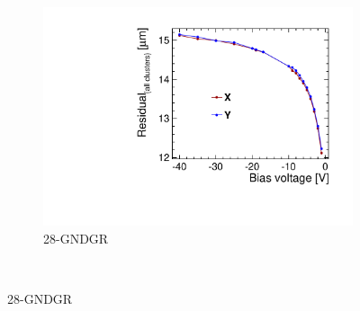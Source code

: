 \begin{figure}[htbp]
\begin{subfigure}[b]{0.33\textwidth}
    \includegraphics[width=\textwidth]{./figures/TestBeam/W19_L8_Residual_vs_bias.pdf}
    \caption{28-GNDGR}
  \end{subfigure} \\


\end{figure}
